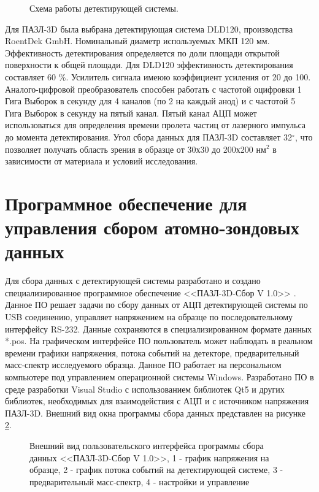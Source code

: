 \begin{figure}[htb]
	\caption{Схема работы детектирующей системы. }
	\label{fig:APPLE_detectionsystem}
\end{figure}

Для ПАЗЛ-3D была выбрана детектирующая система DLD120, производства RoentDek GmbH. Номинальный диаметр используемых МКП 120 мм. Эффективность детектирования определяется по доли площади открытой поверхности к общей площади. Для DLD120 эффективность детектирования составляет 60 \%. Усилитель сигнала имеюю коэффициент усиления от 20 до 100. Аналого-цифровой преобразователь способен работать с частотой оцифровки 1 Гига Выборок в секунду для 4 каналов (по 2 на каждый анод) и с частотой 5 Гига Выборок в секунду на пятый канал. Пятый канал АЦП может использоваться для определения времени пролета частиц от лазерного импульса до момента детектирования. Угол сбора данных для ПАЗЛ-3D составляет 32$^{\circ}$, что позволяет получать область зрения в образце от 30х30 до 200х200 $нм^{2}$ в зависимости от материала и условий исследования.

\FloatBarrier

\section{Программное обеспечение для управления сбором атомно-зондовых данных}\label{sec:ch2/sec5}

Для сбора данных с детектирующей системы разработано и создано специализированное программное обеспечение <<ПАЗЛ-3D-Сбор V 1.0>> \cite{SBOR}. Данное ПО решает задачи по сбору данных от АЦП детектирующей системы по USB соединению, управляет напряжением на образце по последовательному интерфейсу RS-232. Данные сохраняются в специализированном формате данных *.pos. На графическом интерфейсе ПО пользователь может наблюдать в реальном времени графики напряжения, потока событий на детекторе, предварительный масс-спектр исследуемого образца. Данное ПО работает на персональном компьютере под управлением операционной системы Windows. Разработано ПО в среде разработки Visual Studio с использованием библиотек Qt5 и других библиотек, необходимых для взаимодействия с АЦП и с источником напряжения ПАЗЛ-3D. Внешний вид окна программы сбора данных представлен на рисунке \cref{fig:APPLE_sbor}.

\begin{figure}[htb]
	\caption{Внешний вид пользовательского интерфейса программы сбора данных  <<ПАЗЛ-3D-Сбор V 1.0>>, 1 - график напряжения на образце, 2 - график потока событий на детектирующей системе, 3 - предварительный масс-спектр, 4 - настройки и управление}
	\label{fig:APPLE_sbor}
\end{figure}

